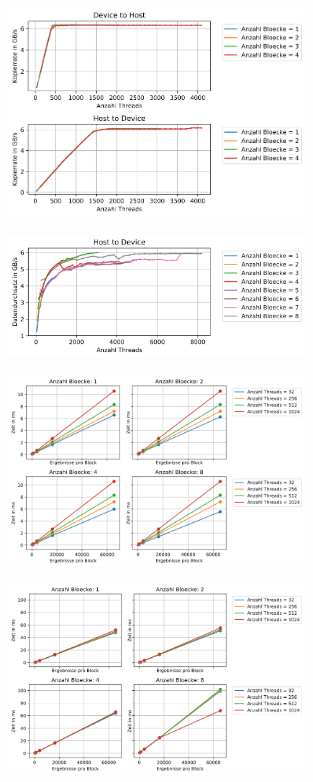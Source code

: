 \documentclass[11pt, abstract=on]{scrartcl}
\begin{document}
\begin{figure} [htbp]
 	\centering
 		\includegraphics[width=0.7\textwidth]{Graph_CudaMalloc.png}
 	\caption{}
\end{figure}

\begin{figure} [htbp]
 	\centering
 		\includegraphics[width=0.7\textwidth]{Graph_CudaMallocManaged.png}
 	\caption{}
\end{figure}

\begin{figure} [htbp]
 	\centering
 		\includegraphics[width=0.7\textwidth]{Graph_KommunikationOhne.png}
 	\caption{}
\end{figure}

\begin{figure} [htbp]
 	\centering
 		\includegraphics[width=0.7\textwidth]{Graph_KommunikationMit.png}
 	\caption{}
\end{figure}
\end{document}
